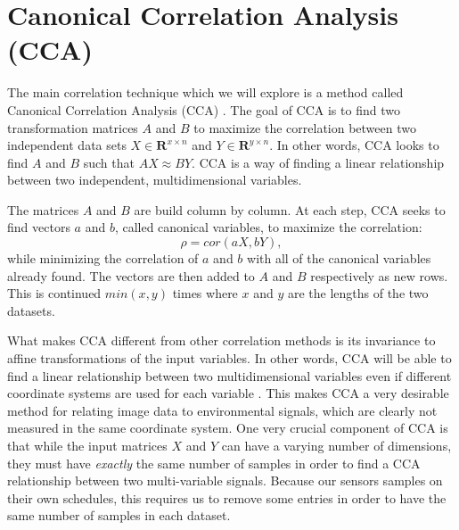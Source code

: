\chapter{Canonical Correlation Analysis (CCA)}
\label{cpt:cca}
The main correlation technique which we will explore is a method called Canonical Correlation Analysis (CCA) \cite{hotelling}. The goal of CCA is to find two transformation matrices $A$ and $B$ to maximize the correlation between two independent data sets $X \in \mathbf{R}^{x\times n}$ and $Y \in \mathbf{R}^{y\times n}$. In other words, CCA looks to find $A$ and $B$ such that $AX\approx BY$. CCA is a way of finding a linear relationship between two independent, multidimensional variables.

The matrices $A$ and $B$ are build column by column. At each step, CCA seeks to find vectors $a$ and $b$, called canonical variables, to maximize the correlation:
\begin{equation}\label{eq:maxcorrcca}\rho = cor(aX,bY),\end{equation}
while minimizing the correlation of $a$ and $b$ with all of the canonical variables already found. The vectors are then added to $A$ and $B$ respectively as new rows. This is continued $min(x,y)$ times where $x$ and $y$ are the lengths of the two datasets.

What makes CCA different from other correlation methods is its invariance to affine transformations of the input variables. In other words, CCA will be able to find a linear relationship between two multidimensional variables even if different coordinate systems are used for each variable \cite{bkl97}. This makes CCA a very desirable method for relating image data to environmental signals, which are clearly not measured in the same coordinate system. One very crucial component of CCA is that while the input matrices $X$ and $Y$ can have a varying number of dimensions, they must have \textit{exactly} the same number of samples in order to find a CCA relationship between two multi-variable signals. Because our sensors samples on their own schedules, this requires us to remove some entries in order to have the same number of samples in each dataset.

